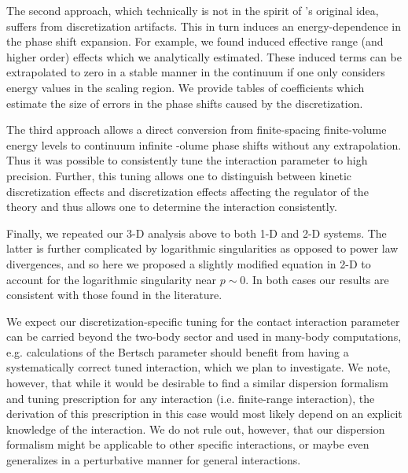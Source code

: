 The second approach, which technically is not in the spirit of \Luscher's original idea, suffers from discretization artifacts.  This in turn induces an energy-dependence in the phase shift expansion.
For example, we found induced effective range (and higher order) effects which we analytically estimated.
These induced terms can be extrapolated to zero in a stable manner in the continuum if one only considers energy values in the scaling region.
We provide tables of coefficients which estimate the size of errors in the phase shifts caused by the discretization.

The third approach allows a direct conversion from finite-spacing finite-volume energy levels to continuum infinite -olume phase shifts without any extrapolation.
Thus it was possible to consistently tune the interaction parameter to high precision.  Further, this tuning allows one to distinguish between kinetic discretization effects and discretization effects affecting the regulator of the theory and thus allows one to determine the interaction consistently.

Finally, we repeated our 3-D analysis above to both 1-D and 2-D systems.  The latter is further complicated by logarithmic singularities as opposed to power law divergences, and so here we proposed a slightly modified \Luscher equation in 2-D to account for the logarithmic singularity near $p\sim 0$.  In both cases our results are consistent with those found in the literature.

We expect our discretization-specific tuning for the contact interaction parameter can be carried beyond the two-body sector and used in many-body computations, e.g. calculations of the Bertsch parameter should benefit from having a systematically correct tuned interaction, which we plan to investigate.
We note, however, that while it would be desirable to find a similar dispersion formalism and tuning prescription for any interaction (i.e. finite-range interaction), the derivation of this prescription in this case would most likely depend on an explicit knowledge of the interaction.
We do not rule out, however, that our dispersion formalism might be applicable to other specific interactions, or maybe even generalizes in a perturbative manner for general interactions.  %


